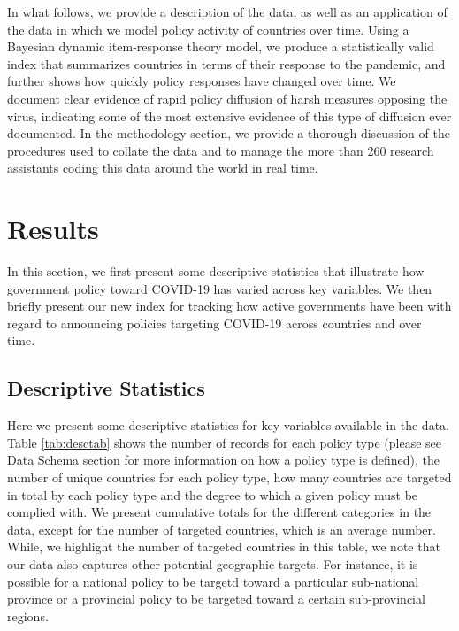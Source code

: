 \documentclass[]{article}
\begin{document}
In what follows, we provide a description of the data, as well as an application of the data in which we model policy activity of countries over time. Using a Bayesian dynamic item-response theory model, we produce a statistically valid index that summarizes countries in terms of their response to the pandemic, and further shows how quickly policy responses have changed over time. We document clear evidence of rapid policy diffusion of harsh measures opposing the virus, indicating some of the most extensive evidence of this type of diffusion ever documented. In the methodology section, we provide a thorough discussion of the procedures used to collate the data and to manage the more than 260 research assistants coding this data around the world in real time.

\hypertarget{results}{%
\section*{Results}\label{results}}

In this section, we first present some descriptive statistics that illustrate how government policy toward COVID-19 has varied across key variables. We then briefly present our new index for tracking how active governments have been with regard to announcing policies targeting COVID-19 across countries and over time.

\hypertarget{descriptive-statistics}{%
\subsection*{Descriptive Statistics}\label{descriptive-statistics}}

Here we present some descriptive statistics for key variables available in the data. Table \ref{tab:desctab} shows the number of records for each policy type (please see Data Schema section for more information on how a policy type is defined), the number of unique countries for each policy type, how many countries are targeted in total by each policy type and the degree to which a given policy must be complied with. We present cumulative totals for the different categories in the data, except for the number of targeted countries, which is an average number. While, we highlight the number of targeted countries in this table, we note that our data also captures other potential geographic targets. For instance, it is possible for a national policy to be targetd toward a particular sub-national province or a provincial policy to be targeted toward a certain sub-provincial regions.
\end{document}
